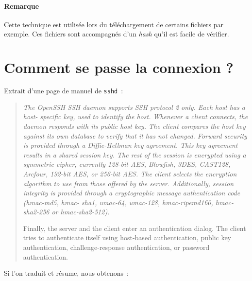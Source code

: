 \documentclass[a4paper,11pt]{article}
\begin{document}
\paragraph{Remarque} Cette technique est utilisée lors du téléchargement de
certains fichiers par exemple. Ces fichiers sont accompagnés d'un \textit{hash}
qu'il est facile de vérifier. 



\clearpage
\section{Comment se passe la connexion ?}
\label{comment-se-passe-la-connexion}

Extrait d'une page de manuel de \texttt{sshd}~:

\begin{quote}

	\it\small
	The OpenSSH SSH daemon supports SSH protocol 2 only.  Each host has a host-
	specific key, used to identify the host.  Whenever a client connects, the
	daemon responds with its public host key.  The client compares the host
	key against its own database to verify that it has not changed.  Forward
	security is provided through a Diffie-Hellman key agreement.  This key
	agreement results in a shared session key.  The rest of the session is
	encrypted using a symmetric cipher, currently 128-bit AES, Blowfish, 3DES,
	CAST128, Arcfour, 192-bit AES, or 256-bit AES.  The client selects the
	encryption algorithm to use from those offered by the server.  Additionally,
	session integrity is provided through a cryptographic message
	authentication code (hmac-md5, hmac- sha1, umac-64, umac-128,
	hmac-ripemd160, hmac-sha2-256 or hmac-sha2-512).
 
	Finally, the server and the client enter an authentication dialog.  The
	client tries to authenticate itself using host-based authentication, public
	key authentication, challenge-response authentication, or password
	authentication.
	
\end{quote}

Si l'on traduit et résume, nous obtenons~:
\end{document}
